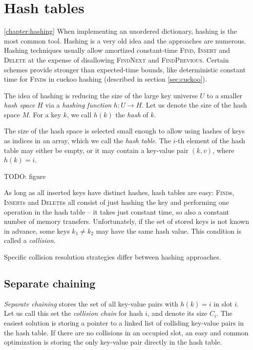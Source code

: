 \chapter{Hash tables}
\ref{chapter:hashing}
When implementing an unordered dictionary, hashing is the most common tool.
Hashing is a very old idea and the approaches are numerous. Hashing
techniques usually allow amortized constant-time \textsc{Find}, \textsc{Insert}
and \textsc{Delete} at the expense of disallowing \textsc{FindNext} and
\textsc{FindPrevious}. Certain schemes provide stronger than expected-time
bounds, like deterministic constant time for \textsc{Find}s in cuckoo hashing
(described in section \ref{sec:cuckoo}).

The idea of hashing is reducing the size of the large key universe $U$ to
a smaller \emph{hash space} $H$ via a \emph{hashing function}
$h\mathop{:}U\rightarrow H$.
Let us denote the size of the hash space $M$.
For a key $k$, we call $h(k)$ the \emph{hash} of $k$.

The size of the hash space is selected small enough to allow using hashes
of keys as indices in an array, which we call the \emph{hash table}.
The $i$-th element of the hash table may either be empty, or it may contain
a key-value pair $(k,v)$, where $h(k)=i$.

TODO: figure

As long as all inserted keys have distinct hashes, hash tables are easy:
\textsc{Find}s, \textsc{Insert}s and \textsc{Delete}s all consist of just
hashing the key and performing one operation in the hash table -- it takes just
constant time, so also a constant number of memory transfers.
Unfortunately, if the set of stored keys is not known in advance,
some keys $k_1\neq k_2$ may have the same hash value.
This condition is called a \emph{collision}.

Specific collision resolution strategies differ between hashing approaches.

\section{Separate chaining}
\emph{Separate chaining} stores the set of all key-value pairs with
$h(k)=i$ in slot $i$. Let us call this set the \emph{collision chain} for hash
$i$, and denote its size $C_i$. The easiest solution is storing a pointer to
a linked list of colliding key-value pairs in the hash table. If there are no
collisions in an occupied slot, an easy and common optimization is storing
the only key-value pair directly in the hash table.

